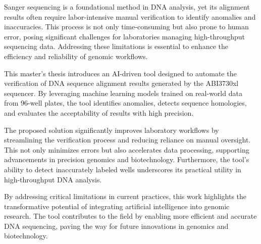 
%

Sanger sequencing is a foundational method in DNA analysis, yet its alignment results often require labor-intensive manual verification to identify anomalies and inaccuracies. This process is not only time-consuming but also prone to human error, posing significant challenges for laboratories managing high-throughput sequencing data. Addressing these limitations is essential to enhance the efficiency and reliability of genomic workflows.

This master's thesis introduces an AI-driven tool designed to automate the verification of DNA sequence alignment results generated by the ABI3730xl sequencer. By leveraging machine learning models trained on real-world data from 96-well plates, the tool identifies anomalies, detects sequence homologies, and evaluates the acceptability of results with high precision.

The proposed solution significantly improves laboratory workflows by streamlining the verification process and reducing reliance on manual oversight. This not only minimizes errors but also accelerates data processing, supporting advancements in precision genomics and biotechnology. Furthermore, the tool’s ability to detect inaccurately labeled wells underscores its practical utility in high-throughput DNA analysis.

By addressing critical limitations in current practices, this work highlights the transformative potential of integrating artificial intelligence into genomic research. The tool contributes to the field by enabling more efficient and accurate DNA sequencing, paving the way for future innovations in genomics and biotechnology.

